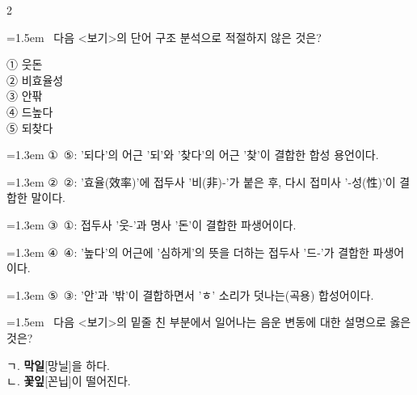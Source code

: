 \documentclass[10pt, a4paper]{article}
\begin{document}
\begin{multicols}{2}
\noindent\begin{minipage}{\columnwidth}
\vspace{2mm}
{\hangindent=1.5em  ~다음 <보기>의 단어 구조 분석으로 적절하지 않은 것은?\par}

\vspace{1mm}
\begin{boxibox}
① 웃돈 \\
② 비효율성 \\
③ 안팎 \\
④ 드높다 \\
⑤ 되찾다 \\
\end{boxibox}
\vspace{1mm}

\vspace{0.5mm}
{\hangindent=1.3em  \noindent\hspace{0.3em}①~⑤: '되다'의 어근 '되'와 '찾다'의 어근 '찾'이 결합한 합성 용언이다.\par}
{\hangindent=1.3em  \noindent\hspace{0.3em}②~②: '효율(效率)'에 접두사 '비(非)-'가 붙은 후, 다시 접미사 '-성(性)'이 결합한 말이다.\par}
{\hangindent=1.3em  \noindent\hspace{0.3em}③~①: 접두사 '웃-'과 명사 '돈'이 결합한 파생어이다.\par}
{\hangindent=1.3em  \noindent\hspace{0.3em}④~④: '높다'의 어근에 '심하게'의 뜻을 더하는 접두사 '드-'가 결합한 파생어이다.\par}
{\hangindent=1.3em  \noindent\hspace{0.3em}⑤~③: '안'과 '밖'이 결합하면서 'ㅎ' 소리가 덧나는(곡용) 합성어이다.\par}
\vspace{4mm}
\end{minipage}
\par

\noindent\begin{minipage}{\columnwidth}
\vspace{2mm}
{\hangindent=1.5em  ~다음 <보기>의 밑줄 친 부분에서 일어나는 음운 변동에 대한 설명으로 옳은 것은?\par}

\vspace{1mm}
\begin{boxibox}
ㄱ. \textbf{막일}[망닐]을 하다. \\
ㄴ. \textbf{꽃잎}[꼰닙]이 떨어진다. \\
\end{boxibox}
\vspace{1mm}


\end{minipage}
\end{multicols}
\end{document}
